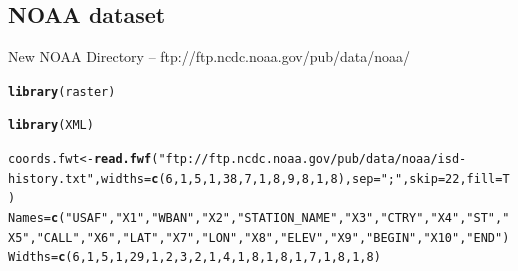 \documentclass{article}\usepackage[]{graphicx}\usepackage[]{color}
\makeatletter
\newcommand{\hlnum}[1]{\textcolor[rgb]{0.686,0.059,0.569}{#1}}%
\newcommand{\hlstr}[1]{\textcolor[rgb]{0.192,0.494,0.8}{#1}}%
\newcommand{\hlstd}[1]{\textcolor[rgb]{0.345,0.345,0.345}{#1}}%
\newcommand{\hlkwb}[1]{\textcolor[rgb]{0.69,0.353,0.396}{#1}}%
\newcommand{\hlkwc}[1]{\textcolor[rgb]{0.333,0.667,0.333}{#1}}%
\newcommand{\hlkwd}[1]{\textcolor[rgb]{0.737,0.353,0.396}{\textbf{#1}}}%
\newenvironment{kframe}{%
 \def\at@end@of@kframe{}%
 \ifinner\ifhmode%
  \def\at@end@of@kframe{\end{minipage}}%
  \begin{minipage}{\columnwidth}%
 \fi\fi%
 \def\FrameCommand##1{\hskip\@totalleftmargin \hskip-\fboxsep
 \colorbox{shadecolor}{##1}\hskip-\fboxsep
     \hskip-\linewidth \hskip-\@totalleftmargin \hskip\columnwidth}%
 \MakeFramed {\advance\hsize-\width
   \@totalleftmargin\z@ \linewidth\hsize
   \@setminipage}}%
 {\par\unskip\endMakeFramed%
 \at@end@of@kframe}
\newenvironment{knitrout}{}{} %
\makeatother
\begin{document}


\subsection{NOAA dataset}

New NOAA Directory -- ftp://ftp.ncdc.noaa.gov/pub/data/noaa/

\begin{knitrout}
\color{fgcolor}\begin{kframe}
\begin{alltt}
\hlkwd{library}\hlstd{(raster)}
\end{alltt}


{\ttfamily\noindent\itshape\color{messagecolor}{\#\# Loading required package: sp\\\#\# \\\#\# Attaching package: 'raster'\\\#\# \\\#\# The following object is masked from 'package:dplyr':\\\#\# \\\#\#\ \ \ \  select\\\#\# \\\#\# The following object is masked from 'package:tidyr':\\\#\# \\\#\#\ \ \ \  extract}}\begin{alltt}
\hlkwd{library}\hlstd{(XML)}

\hlstd{coords.fwt} \hlkwb{<-} \hlkwd{read.fwf}\hlstd{(}\hlstr{"ftp://ftp.ncdc.noaa.gov/pub/data/noaa/isd-history.txt"}\hlstd{,}\hlkwc{widths}\hlstd{=}\hlkwd{c}\hlstd{(}\hlnum{6}\hlstd{,}\hlnum{1}\hlstd{,}\hlnum{5}\hlstd{,}\hlnum{1}\hlstd{,}\hlnum{38}\hlstd{,}\hlnum{7}\hlstd{,}\hlnum{1}\hlstd{,}\hlnum{8}\hlstd{,}\hlnum{9}\hlstd{,}\hlnum{8}\hlstd{,}\hlnum{1}\hlstd{,}\hlnum{8}\hlstd{),}\hlkwc{sep}\hlstd{=}\hlstr{";"}\hlstd{,}\hlkwc{skip}\hlstd{=}\hlnum{22}\hlstd{,}\hlkwc{fill}\hlstd{=T)}
\hlstd{Names} \hlkwb{=} \hlkwd{c}\hlstd{(}\hlstr{"USAF"}\hlstd{,} \hlstr{"X1"}\hlstd{,} \hlstr{"WBAN"}\hlstd{,} \hlstr{"X2"}\hlstd{,} \hlstr{"STATION_NAME"}\hlstd{,} \hlstr{"X3"}\hlstd{,} \hlstr{"CTRY"}\hlstd{,} \hlstr{"X4"}\hlstd{,} \hlstr{"ST"}\hlstd{,} \hlstr{"X5"}\hlstd{,} \hlstr{"CALL"}\hlstd{,} \hlstr{"X6"}\hlstd{,} \hlstr{"LAT"}\hlstd{,} \hlstr{"X7"}\hlstd{,} \hlstr{"LON"}\hlstd{,} \hlstr{"X8"}\hlstd{,} \hlstr{"ELEV"}\hlstd{,} \hlstr{"X9"}\hlstd{,} \hlstr{"BEGIN"}\hlstd{,} \hlstr{"X10"}\hlstd{,} \hlstr{"END"}\hlstd{)}
\hlstd{Widths} \hlkwb{=} \hlkwd{c}\hlstd{(}\hlnum{6}\hlstd{,}       \hlnum{1}\hlstd{,}    \hlnum{5}\hlstd{,}      \hlnum{1}\hlstd{,}        \hlnum{29}\hlstd{,}         \hlnum{1}\hlstd{,}    \hlnum{2}\hlstd{,}      \hlnum{3}\hlstd{,}    \hlnum{2}\hlstd{,}    \hlnum{1}\hlstd{,}    \hlnum{4}\hlstd{,}      \hlnum{1}\hlstd{,}    \hlnum{8}\hlstd{,}     \hlnum{1}\hlstd{,}     \hlnum{8}\hlstd{,}    \hlnum{1}\hlstd{,}    \hlnum{7}\hlstd{,}     \hlnum{1}\hlstd{,}     \hlnum{8}\hlstd{,}      \hlnum{1}\hlstd{,}    \hlnum{8}\hlstd{)}


\end{alltt}
\end{kframe}
\end{knitrout}
\end{document}
